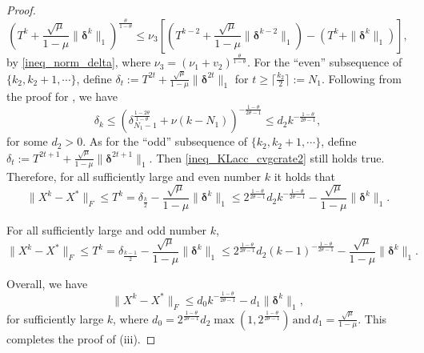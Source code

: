 \documentclass[twoside,11pt]{article}
\numberwithin{equation}{section}
\begin{document}
\begin{proof}
 \begin{equation}
    \left(T^{k}+\frac{\sqrt{\mu}}{1-\mu}\|\bm{\delta}^{k}\|_{1}\right)^{\frac{\theta}{1-\theta}} \le \nu_{3}\left[ (T^{k-2}+\frac{\sqrt{\mu}}{1-\mu}\|\bm{\delta}^{k-2}\|_{1})- (T^{k} +\|\bm{\delta}^{k}\|_{1})\right],
 \end{equation}
   by   \eqref{ineq_norm_delta}, where $\nu_{3}= \left(\nu_{1}+v_{2}\right)^\frac{\theta}{1-\theta} $.
 For the ``even'' subsequence of $\{k_{2},k_{2}+1,\cdots\} $,  define $ \delta_{t}:=T^{2t}+\frac{\sqrt{\mu}}{1-\mu}\|\bm{\delta}^{2t}\|_{1} $ for $t\ge \lceil\frac{k_{2}}{2}\rceil:=N_{1} $. Following from the proof for \cite[Theorem 4,Theorem 2]{Zeng_Acc_2022,attouch2009convergence},  we have
 \begin{equation}\label{ineq_KLacc_cvgcrate2}
    \delta_{k} \le  \left( \delta_{N_{1}-1}^{\frac{1-2\theta}{1-\theta}} + \nu (k-N_{1})\right)^{-\frac{1-\theta}{2\theta-1}} \le d_{2}k^{-\frac{1-\theta}{2\theta-1}} ,
 \end{equation}
 for some $d_{2}>0 $. As for the  ``odd'' subsequence of $\{k_{2},k_{2}+1,\cdots\} $,  define $ \delta_{t}:=T^{2t+1}+\frac{\sqrt{\mu}}{1-\mu}\|\bm{\delta}^{2t+1}\|_{1} $. Then \eqref{ineq_KLacc_cvgcrate2} still holds true.  
 Therefore, for all sufficiently large and even number $k $ it holds that
 \begin{equation}
   \|X^{k}-X^{*}\|_{F}\le T^{k}=  \delta_{\frac{k}{2}}-\frac{\sqrt{\mu}}{1-\mu}\|\bm{\delta}^{k}\|_{1} \le 2^{\frac{1-\theta}{2\theta-1}}d_{2} k^{-\frac{1-\theta}{2\theta-1}}-\frac{\sqrt{\mu}}{1-\mu}\|\bm{\delta}^{k}\|_{1}.
 \end{equation}
 
 For all sufficiently large and odd number $k $,
 \begin{equation}
   \|X^{k}-X^{*}\|_{F}\le T^{k} =  \delta_{\frac{k-1}{2}}-\frac{\sqrt{\mu}}{1-\mu}\|\bm{\delta}^{k}\|_{1} \le 2^{\frac{1-\theta}{2\theta-1}}d_{2}  (k-1)^{-\frac{1-\theta}{2\theta-1}}-\frac{\sqrt{\mu}}{1-\mu}\|\bm{\delta}^{k}\|_{1}.
 \end{equation}
 
 Overall, we have 
 \begin{equation}
   \|X^{k}-X^{*}\|_{F}\le d_{0} k^{-\frac{1-\theta}{2\theta-1}}-d_{1}\|\bm{\delta}^{k}\|_{1},
 \end{equation}
 for sufficiently large $k $, where
   $
   d_{0} =2^{\frac{1-\theta}{2\theta-1}}d_{2}\max \left(1,2^{\frac{1-\theta}{2\theta-1}}\right) \,\text{and}\, d_{1} =\frac{\sqrt{\mu}}{1-\mu}.
   $ 
 This completes the proof of  (iii).
  \end{proof}
 
\end{document}
